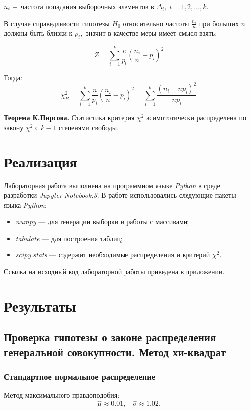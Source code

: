 \documentclass[12pt,a4paper]{article}
\begin{document}
	$n_i\;\--$ частота попадания выборочных элементов в $\Delta_i,\;i=1,2,\ldots,k.$
	
	В случае справедливости гипотезы $H_0$ относительно частоты $\frac{n_i}{n}$ при больших $n$ должны быть близки к $p_i,$ значит в качестве меры имеет смысл взять: 
	
	\begin{equation}
	Z = \sum\limits_{i=1}^k\frac{n}{p_i}\left(\frac{n_i}{n}-p_i\right)^2
	\end{equation}
	
	Тогда:
	\begin{equation}
	\chi^2_B=\sum\limits_{i=1}^k\frac{n}{p_i}\left(\frac{n_i}{n}-p_i\right)^2=\sum\limits_{i=1}^k\frac{(n_i-np_i)^2}{np_i}
	\end{equation}
	
	\textbf{Теорема К.Пирсона.} Статистика критерия $\chi^2$ асимптотически распределена по закону $\chi^2$ с $k - 1$ степенями свободы.
	
	\section{Реализация}
		Лабораторная работа выполнена на программном языке \emph{Python} в среде разработки \emph{Jupyter Notebook.3}. В работе использовались следующие пакеты языка \emph{Python}:
		\begin{itemize}
			\item \emph{numpy} --- для генерации выборки и работы с массивами;
			
			\item \emph{tabulate} --- для построения таблиц;
			
			\item \emph{scipy.stats} --- содержит необходимые распределения и критерий $\chi^2$.
		\end{itemize}
		Ссылка на исходный код лабораторной работы приведена в приложении.

	\section{Результаты}
		\subsection{Проверка гипотезы о законе распределения генеральной совокупности. Метод хи-квадрат}
			\subsubsection{Стандартное нормальное распределение}
				Метод максимального правдоподобия:
				$$\hat{\mu} \approx 0.01, \quad \hat{\sigma} \approx 1.02.$$
				
\end{document}
